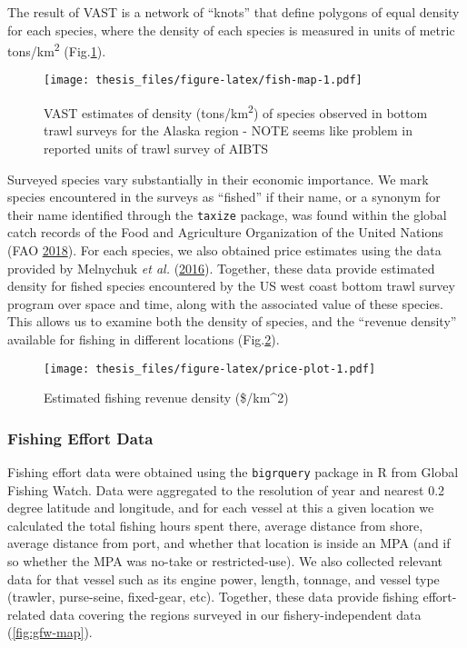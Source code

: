 \documentclass[twoside,12pt,final]{ucthesis-CA2012}
\begin{document}
\begin{ucmainmatter}
The result of VAST is a network of ``knots'' that define polygons of
equal density for each species, where the density of each species is
measured in units of metric tons/km\textsuperscript{2}
(Fig.\ref{fig:fish-map}).
\begin{figure}
\centering
\texttt{[image: thesis\_files/figure-latex/fish-map-1.pdf]}
\caption{\label{fig:fish-map}VAST estimates of density
(tons/km\textsuperscript{2}) of species observed in bottom trawl surveys
for the Alaska region - NOTE seems like problem in reported units of
trawl survey of AIBTS}
\end{figure}
Surveyed species vary substantially in their economic importance. We
mark species encountered in the surveys as ``fished'' if their name, or
a synonym for their name identified through the \texttt{taxize} package,
was found within the global catch records of the Food and Agriculture
Organization of the United Nations (FAO
\protect\hyperlink{ref-FAO2018}{2018}). For each species, we also
obtained price estimates using the data provided by Melnychuk \emph{et
al.} (\protect\hyperlink{ref-Melnychuk2016}{2016}). Together, these data
provide estimated density for fished species encountered by the US west
coast bottom trawl survey program over space and time, along with the
associated value of these species. This allows us to examine both the
density of species, and the ``revenue density'' available for fishing in
different locations (Fig.\ref{fig:price-plot}).
\begin{figure}
\centering
\texttt{[image: thesis\_files/figure-latex/price-plot-1.pdf]}
\caption{\label{fig:price-plot}Estimated fishing revenue density
(\$/km\^{}2)}
\end{figure}
\subsubsection{Fishing Effort Data}\label{fishing-effort-data}

Fishing effort data were obtained using the \texttt{bigrquery} package
in R from Global Fishing Watch. Data were aggregated to the resolution
of year and nearest 0.2 degree latitude and longitude, and for each
vessel at this a given location we calculated the total fishing hours
spent there, average distance from shore, average distance from port,
and whether that location is inside an MPA (and if so whether the MPA
was no-take or restricted-use). We also collected relevant data for that
vessel such as its engine power, length, tonnage, and vessel type
(trawler, purse-seine, fixed-gear, etc). Together, these data provide
fishing effort-related data covering the regions surveyed in our
fishery-independent data (\ref{fig:gfw-map}).


\end{ucmainmatter}
\end{document}

